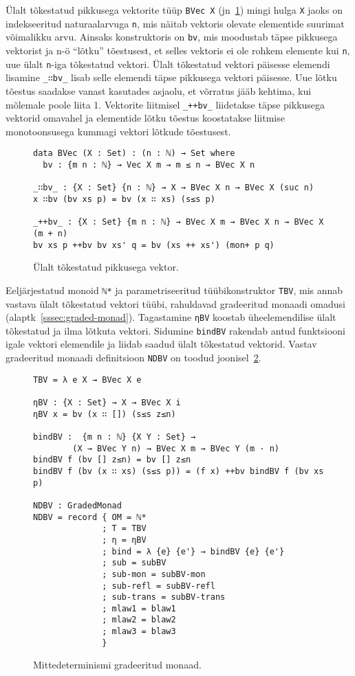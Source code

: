 \documentclass[a4paper,12pt]{article}
\begin{document}
Ülalt tõkestatud pikkusega vektorite tüüp {\tt BVec X} (jn~\ref{fig:nd.bvec}) mingi hulga {\tt X} jaoks on indekseeritud naturaalarvuga {\tt n}, mis näitab vektoris olevate elementide suurimat võimalikku arvu.
Ainsaks konstruktoris on {\tt bv}, mis moodustab täpse pikkusega vektorist ja n-ö ``lõtku'' tõestusest, et selles vektoris ei ole rohkem elemente kui {\tt n}, uue ülalt {\tt n}-iga tõkestatud vektori.
Ülalt tõkestatud vektori päisesse elemendi lisamine {\tt _∷bv_} lisab selle elemendi täpse pikkusega vektori päisesse. Uue lõtku tõestus saadakse vanast kasutades asjaolu, et võrratus jääb kehtima, kui mõlemale poole liita 1.
Vektorite liitmisel {\tt _++bv_} liidetakse täpse pikkusega vektorid omavahel ja elementide lõtku tõestus koostatakse liitmise monotoonsusega kummagi vektori lõtkude tõestusest.

\begin{figure}
  \begin{BVerbatim}
data BVec (X : Set) : (n : ℕ) → Set where
  bv : {m n : ℕ} → Vec X m → m ≤ n → BVec X n

_∷bv_ : {X : Set} {n : ℕ} → X → BVec X n → BVec X (suc n)
x ∷bv (bv xs p) = bv (x ∷ xs) (s≤s p)

_++bv_ : {X : Set} {m n : ℕ} → BVec X m → BVec X n → BVec X (m + n)
bv xs p ++bv bv xs' q = bv (xs ++ xs') (mon+ p q)    
  \end{BVerbatim}
  \caption{Ülalt tõkestatud pikkusega vektor.}
  \label{fig:nd.bvec}
\end{figure}

Eeljärjestatud monoid {\tt ℕ*} ja parametriseeritud tüübikonstruktor {\tt TBV}, mis annab vastava ülalt tõkestatud vektori tüübi, rahuldavad gradeeritud monaadi omadusi (alaptk~\ref{sssec:graded-monad}). Tagastamine {\tt ηBV} koostab üheelemendilise ülalt tõkestatud ja ilma lõtkuta vektori. Sidumine {\tt bindBV} rakendab antud funktsiooni igale vektori elemendile ja liidab saadud ülalt tõkestatud vektorid.
Vastav gradeeritud monaadi definitsioon {\tt NDBV} on toodud joonisel~\ref{fig:nd.graded-monad}.


\begin{figure}
  \begin{BVerbatim}
TBV = λ e X → BVec X e

ηBV : {X : Set} → X → BVec X i
ηBV x = bv (x ∷ []) (s≤s z≤n)

bindBV :  {m n : ℕ} {X Y : Set} →
        (X → BVec Y n) → BVec X m → BVec Y (m · n)
bindBV f (bv [] z≤n) = bv [] z≤n
bindBV f (bv (x ∷ xs) (s≤s p)) = (f x) ++bv bindBV f (bv xs p)

NDBV : GradedMonad
NDBV = record { OM = ℕ*
              ; T = TBV
              ; η = ηBV
              ; bind = λ {e} {e'} → bindBV {e} {e'}
              ; sub = subBV
              ; sub-mon = subBV-mon
              ; sub-refl = subBV-refl
              ; sub-trans = subBV-trans
              ; mlaw1 = blaw1
              ; mlaw2 = blaw2
              ; mlaw3 = blaw3
              }
  \end{BVerbatim}
  \caption{Mittedeterminismi gradeeritud monaad.}
  \label{fig:nd.graded-monad}
\end{figure}
\end{document}
